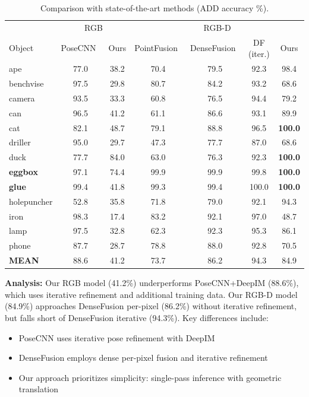 \begin{table}[h]
\centering
\caption{Comparison with state-of-the-art methods (ADD accuracy \%).}
\label{tab:sota_comparison}
\begin{tabular}{l|cc|cccc}
\toprule
& \multicolumn{2}{c|}{RGB} & \multicolumn{4}{c}{RGB-D} \\
Object & PoseCNN~\cite{xiang2018posecnn} & Ours & PointFusion~\cite{xu2018pointfusion} & DenseFusion~\cite{wang2019densefusion} & DF (iter.) & Ours \\
\midrule
ape & 77.0 & 38.2 & 70.4 & 79.5 & 92.3 & 98.4 \\
benchvise & 97.5 & 29.8 & 80.7 & 84.2 & 93.2 & 68.6 \\
camera & 93.5 & 33.3 & 60.8 & 76.5 & 94.4 & 79.2 \\
can & 96.5 & 41.2 & 61.1 & 86.6 & 93.1 & 89.9 \\
cat & 82.1 & 48.7 & 79.1 & 88.8 & 96.5 & \textbf{100.0} \\
driller & 95.0 & 29.7 & 47.3 & 77.7 & 87.0 & 68.6 \\
duck & 77.7 & 84.0 & 63.0 & 76.3 & 92.3 & \textbf{100.0} \\
\textbf{eggbox} & 97.1 & 74.4 & 99.9 & 99.9 & 99.8 & \textbf{100.0} \\
\textbf{glue} & 99.4 & 41.8 & 99.3 & 99.4 & 100.0 & \textbf{100.0} \\
holepuncher & 52.8 & 35.8 & 71.8 & 79.0 & 92.1 & 94.3 \\
iron & 98.3 & 17.4 & 83.2 & 92.1 & 97.0 & 48.7 \\
lamp & 97.5 & 32.8 & 62.3 & 92.3 & 95.3 & 86.1 \\
phone & 87.7 & 28.7 & 78.8 & 88.0 & 92.8 & 70.5 \\
\midrule
\textbf{MEAN} & 88.6 & 41.2 & 73.7 & 86.2 & 94.3 & 84.9 \\
\bottomrule
\end{tabular}
\end{table}

\textbf{Analysis:} Our RGB model (41.2\%) underperforms PoseCNN+DeepIM (88.6\%), which uses iterative refinement and additional training data. Our RGB-D model (84.9\%) approaches DenseFusion per-pixel (86.2\%) without iterative refinement, but falls short of DenseFusion iterative (94.3\%). Key differences include:
\begin{itemize}
    \item PoseCNN uses iterative pose refinement with DeepIM
    \item DenseFusion employs dense per-pixel fusion and iterative refinement
    \item Our approach prioritizes simplicity: single-pass inference with geometric translation
\end{itemize}

